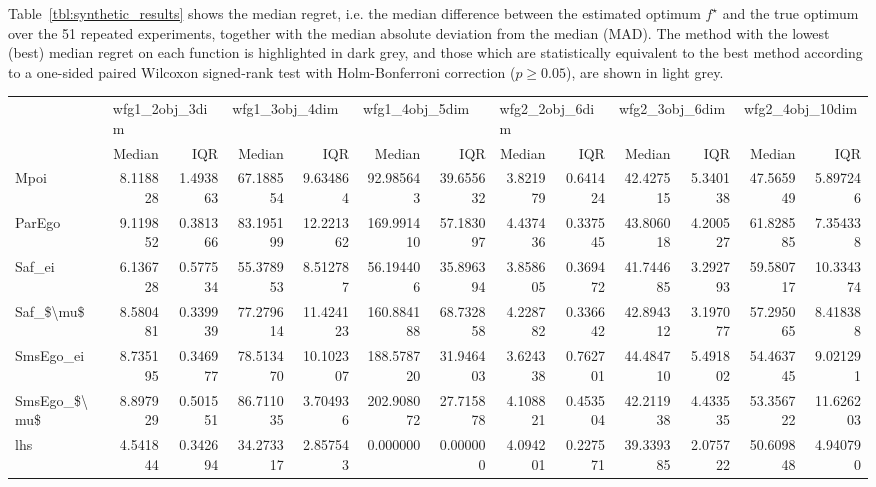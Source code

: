 \documentclass[
dvipsnames, table,   %
format=acmsmall,     %
anonymous=true,      %
authorversion=false, %
]{acmart}
\makeatletter
\newcommand{\fstar}{f^\star}
\newcommand*{\ie}{i.e.\@\xspace}
\makeatother
\begin{document}
Table~\ref{tbl:synthetic_results} shows the median regret, \ie the median
difference between the estimated optimum $\fstar$ and the true optimum %
over the 51 repeated experiments, together with the median
absolute deviation from the median (MAD). The method with the lowest (best)
median regret on each function is highlighted in dark grey, and those which are
statistically equivalent to the best method according to a one-sided paired 
Wilcoxon signed-rank test \citep{knowles:testing} with Holm-Bonferroni correction
\citep{holm:test} ($p\geq0.05$), are shown in light grey.


\begin{tabular}{lrrrrrrrrrrrr}
\toprule
{} & \multicolumn{2}{l}{wfg1\_2obj\_3dim} & \multicolumn{2}{l}{wfg1\_3obj\_4dim} & \multicolumn{2}{l}{wfg1\_4obj\_5dim} & \multicolumn{2}{l}{wfg2\_2obj\_6dim} & \multicolumn{2}{l}{wfg2\_3obj\_6dim} & \multicolumn{2}{l}{wfg2\_4obj\_10dim} \\
{} &         Median &       IQR &         Median &        IQR &         Median &        IQR &         Median &       IQR &         Median &       IQR &          Median &        IQR \\
\midrule
Mpoi         &       8.118828 &  1.493863 &      67.188554 &   9.634864 &      92.985643 &  39.655632 &       3.821979 &  0.641424 &      42.427515 &  5.340138 &       47.565949 &   5.897246 \\
ParEgo       &       9.119852 &  0.381366 &      83.195199 &  12.221362 &     169.991410 &  57.183097 &       4.437436 &  0.337545 &      43.806018 &  4.200527 &       61.828585 &   7.354338 \\
Saf\_ei       &       6.136728 &  0.577534 &      55.378953 &   8.512787 &      56.194406 &  35.896394 &       3.858605 &  0.369472 &      41.744685 &  3.292793 &       59.580717 &  10.334374 \\
Saf\_\$\textbackslash mu\$    &       8.580481 &  0.339939 &      77.279614 &  11.424123 &     160.884188 &  68.732858 &       4.228782 &  0.336642 &      42.894312 &  3.197077 &       57.295065 &   8.418388 \\
SmsEgo\_ei    &       8.735195 &  0.346977 &      78.513470 &  10.102307 &     188.578720 &  31.946403 &       3.624338 &  0.762701 &      44.484710 &  5.491802 &       54.463745 &   9.021291 \\
SmsEgo\_\$\textbackslash mu\$ &       8.897929 &  0.501551 &      86.711035 &   3.704936 &     202.908072 &  27.715878 &       4.108821 &  0.453504 &      42.211938 &  4.433535 &       53.356722 &  11.626203 \\
lhs          &       4.541844 &  0.342694 &      34.273317 &   2.857543 &       0.000000 &   0.000000 &       4.094201 &  0.227571 &      39.339385 &  2.075722 &       50.609848 &   4.940790 \\
\bottomrule
\end{tabular}
\end{document}
